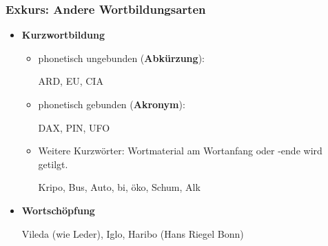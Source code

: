 \begin{frame}
\frametitle{Exkurs: Andere Wortbildungsarten}

\begin{itemize}
\item \textbf{Kurzwortbildung}

\begin{itemize}
	\item phonetisch ungebunden (\textbf{Abkürzung}):
	
	\ea ARD, EU, CIA
	\z
	
	\item phonetisch gebunden (\textbf{Akronym}):
	
	\ea DAX, PIN, UFO
	\z

	\item Weitere Kurzwörter: Wortmaterial am Wortanfang oder -ende wird getilgt.
	
	\ea Kripo, Bus, Auto, bi, öko, Schum, Alk
	\z
	
\end{itemize}


\item \textbf{Wortschöpfung}

\ea Vileda (wie Leder), Iglo, Haribo (Hans Riegel Bonn)
\z

\end{itemize}

\end{frame}


